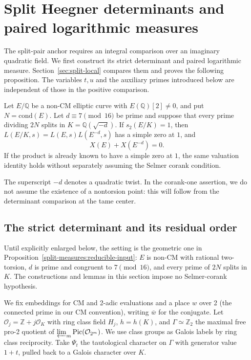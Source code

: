 \section[Split Heegner determinants and paired logarithmic measures]{Split Heegner determinants and\\paired logarithmic measures}\label{sec:split-measures}

The split-pair anchor requires an integral comparison over an imaginary
quadratic field.  We first construct its strict determinant and paired
logarithmic measure.  Section~\ref{sec:split-local} compares them and proves
the following proposition.  The variables \(t,u\) and the auxiliary primes
introduced below are independent of those in the positive comparison.

\begin{proposition}
\label{split-measures:reducible-input}
Let \(E/\mathbb Q\) be a non-CM elliptic curve with
\(E(\mathbb Q)[2]\ne0\), and put \(N=\mathrm{cond}(E)\).
Let \(d\equiv7\pmod {16}\) be prime and suppose that every prime dividing
\(2N\) splits in \(K=\mathbb Q(\sqrt{-d})\).  If \(s_2(E/K)=1\), then
\(L(E/K,s)=L(E,s)L(E^{-d},s)\) has a simple zero at \(1\), and
\[
                              X(E)+X(E^{-d})=0 .
\]
If the product is already known to have a simple zero at \(1\), the same
valuation identity holds without separately assuming the Selmer corank
condition.
\end{proposition}

The superscript \(-d\) denotes a quadratic twist.  In the corank-one
assertion, we do not assume the existence of a nontorsion point: this will
follow from the determinant comparison at the tame center.

\subsection{The strict determinant and its residual order}

Until explicitly enlarged below, the setting is the geometric one in
Proposition~\ref{split-measures:reducible-input}: \(E\) is non-CM with
rational two-torsion, \(d\) is prime and congruent to \(7\pmod {16}\),
and every prime of \(2N\) splits in \(K\).  The constructions and
lemmas in this section impose no Selmer-corank hypothesis.

We fix embeddings for CM and 2-adic evaluations and a place \(w\) over 2 (the connected prime in our CM convention), writing \(\bar w\) for the conjugate. Let \(\mathcal O_j=\mathbb Z+j\mathcal O_K\) with ring class field \(H_j\), \(h=h(K)\), and \(\Gamma\simeq\mathbb Z_2\) the maximal free pro-2 quotient of \(\varprojlim_m\operatorname{Pic}(\mathcal O_{2^m})\). We use class groups as Galois labels by ring class reciprocity. Take \(\Psi_t\) the tautological character on \(\Gamma\) with generator value \(1+t\), pulled back to a Galois character over \(K\). 

